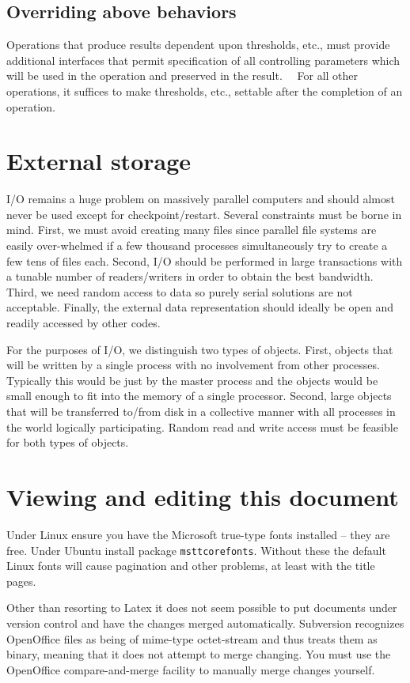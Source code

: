 \documentclass[letterpaper]{article}
\begin{document}
\subsection{Overriding above behaviors}
Operations that produce results dependent upon thresholds, etc., must provide additional interfaces that permit
specification of all controlling parameters which will be used in the operation and preserved in the result. \ \ For
all other operations, it suffices to make thresholds, etc., settable after the completion of an operation.

\section{External storage}
I/O remains a huge problem on massively parallel computers and should almost never be used except for
checkpoint/restart. Several constraints must be borne in mind. First, we must avoid creating many files since parallel
file systems are easily over-whelmed if a few thousand processes simultaneously try to create a few tens of files each.
Second, I/O should be performed in large transactions with a tunable number of readers/writers in order to obtain the
best bandwidth. Third, we need random access to data so purely serial solutions are not acceptable. Finally, the
external data representation should ideally be open and readily accessed by other codes.

For the purposes of I/O, we distinguish two types of objects. First, objects that will be written by a single process
with no involvement from other processes. Typically this would be just by the master process and the objects would be
small enough to fit into the memory of a single processor. Second, large objects that will be transferred to/from disk
in a collective manner with all processes in the world logically participating. Random read and write access must be
feasible for both types of objects.

\section[Viewing and editing this document]{Viewing and editing this document}
Under Linux ensure you have the Microsoft true-type fonts installed -- they are free. Under Ubuntu install package
\texttt{msttcorefonts}. Without these the default Linux fonts will cause pagination and other problems, at least with
the title pages.

Other than resorting to Latex it does not seem possible to put documents under version control and have the changes
merged automatically. Subversion recognizes OpenOffice files as being of mime-type octet-stream and thus treats them as
binary, meaning that it does not attempt to merge changing. You must use the OpenOffice compare-and-merge facility to
manually merge changes yourself.


\bigskip
\end{document}

